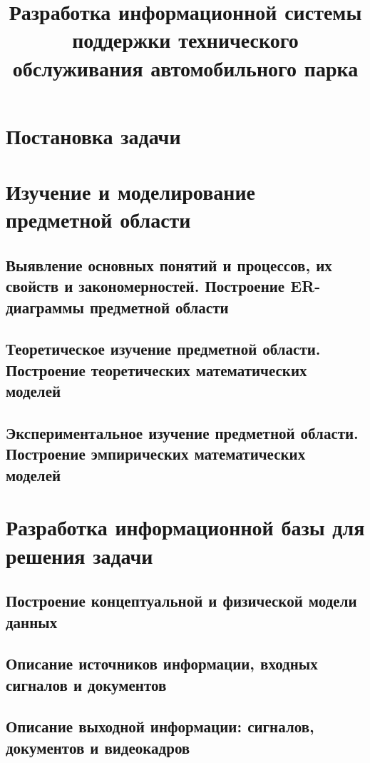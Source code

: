\documentclass{lstu-diploma}
\title{Разработка информационной системы поддержки технического обслуживания автомобильного парка}
\begin{document}
\maketitle

\tableofcontents

\chapter{Постановка задачи}




\chapter{Изучение и моделирование предметной области}
\section{Выявление основных понятий и процессов, их свойств и закономерностей. Построение ER-диаграммы предметной области}

\section{Теоретическое изучение предметной области. Построение теоретических математических моделей}

\section{Экспериментальное изучение предметной области. Построение эмпирических математических моделей}

\chapter{Разработка информационной базы для решения задачи}

\section{Построение концептуальной и физической модели данных}

\section{Описание источников информации, входных сигналов и документов}

\section{Описание выходной информации: сигналов, документов и видеокадров}
\end{document}
